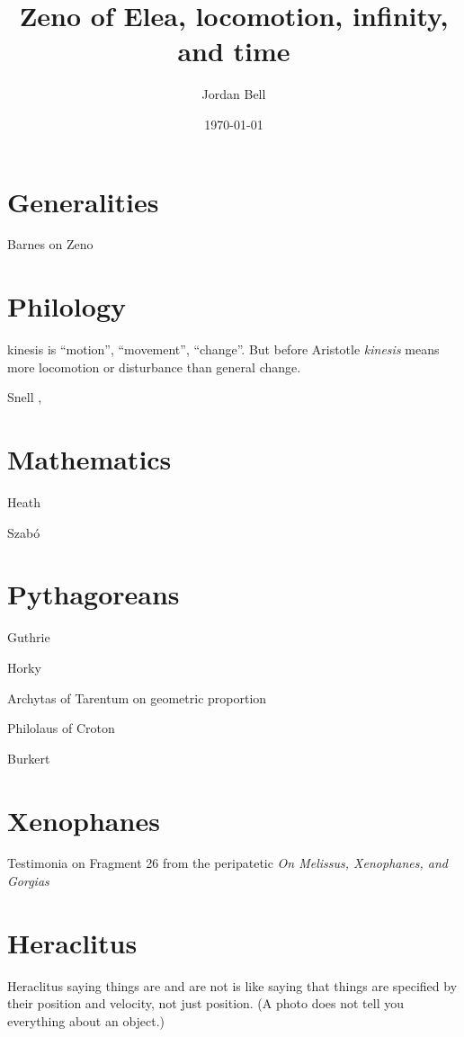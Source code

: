 \documentclass{amsart}
\theoremstyle{definition}
\begin{document}
\title{Zeno of Elea, locomotion, infinity, and time}
\author{Jordan Bell}
\address{Department of Mathematics, University of Toronto, Toronto, Ontario, Canada}
\date{\today}

\maketitle

\section{Generalities}
Barnes \cite{barnes} on Zeno


\section{Philology}
\textrm{kinesis} is ``motion'', ``movement'', ``change''. But before Aristotle {\em kinesis} means more locomotion or
disturbance
than general change.

Snell \cite[p.~217, chapter 9]{snell}, \cite[pp.~241--244, chapter 10]{snell}


\section{Mathematics}
Heath \cite[pp.~271--283]{HGMI}

Szab\'o \cite{szabo}


\section{Pythagoreans}
Guthrie \cite{sylvanguthrie}

Horky \cite{horky}

Archytas of Tarentum on geometric proportion \cite{archytas}

Philolaus of Croton \cite{philolaus}

Burkert \cite[pp.~285--288]{burkert}

\section{Xenophanes}
Testimonia on Fragment 26 from the peripatetic {\em On Melissus, Xenophanes, and Gorgias} \cite[pp.~204--210]{xenophanes}


\section{Heraclitus}
Heraclitus saying things are and are not is like saying that things are specified by their position and velocity, not just position. (A photo does not tell you everything about an object.)
\end{document}
